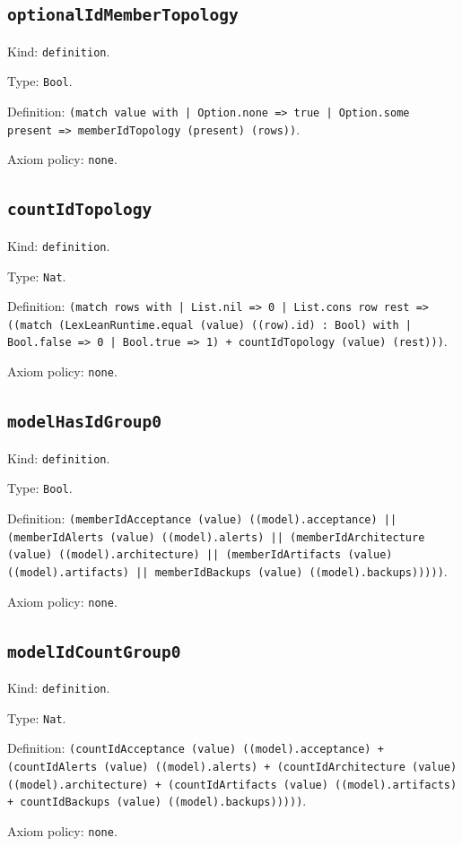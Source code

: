 \documentclass[11pt]{article}
\begin{document}
\subsection*{\texttt{optionalIdMemberTopology}}
\noindent Kind: \texttt{definition}.\par
\noindent Type: \texttt{Bool}.\par
\noindent Definition: \texttt{(match value with | Option.none => true | Option.some present => memberIdTopology (present) (rows))}.\par
\noindent Axiom policy: \texttt{none}.\par
\subsection*{\texttt{countIdTopology}}
\noindent Kind: \texttt{definition}.\par
\noindent Type: \texttt{Nat}.\par
\noindent Definition: \texttt{(match rows with | List.nil => 0 | List.cons row rest => ((match (LexLeanRuntime.equal (value) ((row).id) : Bool) with | Bool.false => 0 | Bool.true => 1) + countIdTopology (value) (rest)))}.\par
\noindent Axiom policy: \texttt{none}.\par
\subsection*{\texttt{modelHasIdGroup0}}
\noindent Kind: \texttt{definition}.\par
\noindent Type: \texttt{Bool}.\par
\noindent Definition: \texttt{(memberIdAcceptance (value) ((model).acceptance) || (memberIdAlerts (value) ((model).alerts) || (memberIdArchitecture (value) ((model).architecture) || (memberIdArtifacts (value) ((model).artifacts) || memberIdBackups (value) ((model).backups)))))}.\par
\noindent Axiom policy: \texttt{none}.\par
\subsection*{\texttt{modelIdCountGroup0}}
\noindent Kind: \texttt{definition}.\par
\noindent Type: \texttt{Nat}.\par
\noindent Definition: \texttt{(countIdAcceptance (value) ((model).acceptance) + (countIdAlerts (value) ((model).alerts) + (countIdArchitecture (value) ((model).architecture) + (countIdArtifacts (value) ((model).artifacts) + countIdBackups (value) ((model).backups)))))}.\par
\noindent Axiom policy: \texttt{none}.\par
\end{document}
